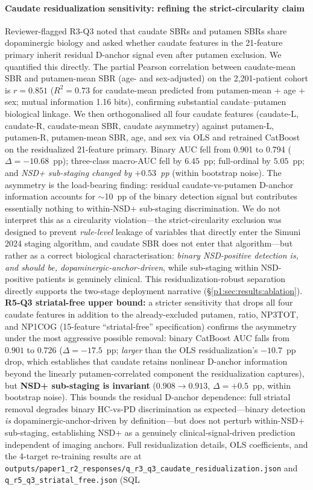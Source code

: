 \paragraph*{Caudate residualization sensitivity: refining the strict-circularity claim} Reviewer-flagged R3-Q3 noted that caudate SBRs and putamen SBRs share dopaminergic biology and asked whether caudate features in the 21-feature primary inherit residual D-anchor signal even after putamen exclusion. We quantified this directly. The partial Pearson correlation between caudate-mean SBR and putamen-mean SBR (age- and sex-adjusted) on the 2{,}201-patient cohort is $r{=}0.851$ ($R^2{=}0.73$ for caudate-mean predicted from putamen-mean + age + sex; mutual information 1.16 bits), confirming substantial caudate--putamen biological linkage. We then orthogonalised all four caudate features (caudate-L, caudate-R, caudate-mean SBR, caudate asymmetry) against putamen-L, putamen-R, putamen-mean SBR, age, and sex via OLS and retrained CatBoost on the residualized 21-feature primary. Binary AUC fell from 0.901 to 0.794 ($\Delta{=}{-}10.68$~pp); three-class macro-AUC fell by $6.45$~pp; full-ordinal by $5.05$~pp; and \emph{NSD+ sub-staging changed by ${+}0.53$~pp} (within bootstrap noise). The asymmetry is the load-bearing finding: residual caudate-vs-putamen D-anchor information accounts for $\sim$10~pp of the binary detection signal but contributes essentially nothing to within-NSD+ sub-staging discrimination. We do not interpret this as a circularity violation---the strict-circularity exclusion was designed to prevent \emph{rule-level} leakage of variables that directly enter the Simuni 2024 staging algorithm, and caudate SBR does not enter that algorithm---but rather as a correct biological characterisation: \emph{binary NSD-positive detection is, and should be, dopaminergic-anchor-driven}, while sub-staging within NSD-positive patients is genuinely clinical. This residualization-robust separation directly supports the two-stage deployment narrative (\S\ref{p1:sec:results:ablation}). \textbf{R5-Q3 striatal-free upper bound:} a stricter sensitivity that drops all four caudate features in addition to the already-excluded putamen, ratio, NP3TOT, and NP1COG (15-feature ``striatal-free'' specification) confirms the asymmetry under the most aggressive possible removal: binary CatBoost AUC falls from $0.901$ to $0.726$ ($\Delta{=}{-}17.5$~pp; \emph{larger} than the OLS residualization's $-10.7$~pp drop, which establishes that caudate retains nonlinear D-anchor information beyond the linearly putamen-correlated component the residualization captures), but \textbf{NSD+ sub-staging is invariant} ($0.908 \rightarrow 0.913$, $\Delta{=}{+}0.5$~pp, within bootstrap noise). This bounds the residual D-anchor dependence: full striatal removal degrades binary HC-vs-PD discrimination as expected---binary detection \emph{is} dopaminergic-anchor-driven by definition---but does not perturb within-NSD+ sub-staging, establishing NSD+ as a genuinely clinical-signal-driven prediction independent of imaging anchors. Full residualization details, OLS coefficients, and the 4-target re-training results are at \texttt{outputs/paper1\_r2\_responses/q\_r3\_q3\_caudate\_residualization.json} and \texttt{q\_r5\_q3\_striatal\_free.json} (SQL 